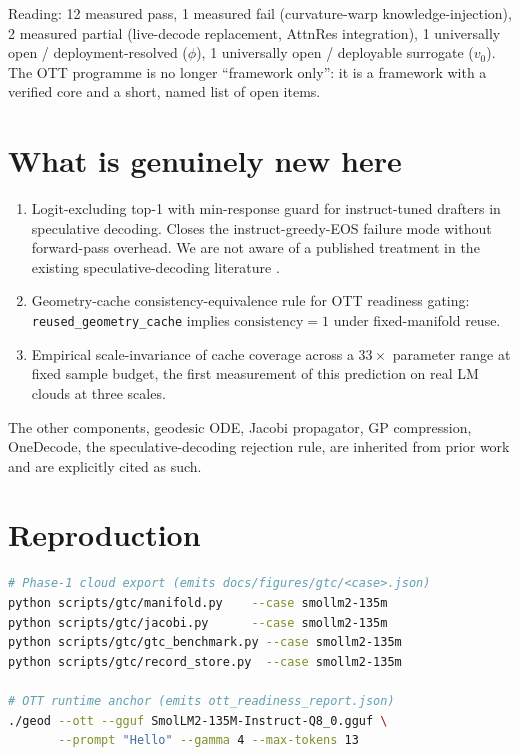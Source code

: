 \documentclass[11pt]{article}
\begin{document}
Reading: 12 measured pass, 1 measured fail (curvature-warp
knowledge-injection), 2 measured partial (live-decode replacement, AttnRes
integration), 1 universally open / deployment-resolved ($\phi$), 1
universally open / deployable surrogate ($v_0$). The OTT programme is no
longer ``framework only'': it is a framework with a verified core and a
short, named list of open items.

\section{What is genuinely new here}

\begin{enumerate}
  \item Logit-excluding top-1 with min-response guard for
        instruct-tuned drafters in speculative decoding. Closes the
        instruct-greedy-EOS failure mode without forward-pass overhead. We are
        not aware of a published treatment in the existing speculative-decoding
        literature \cite{leviathan2023fast,chen2023accelerating,cai2024medusa,li2024eagle}.
  \item Geometry-cache consistency-equivalence rule for OTT readiness
        gating: \texttt{reused\_geometry\_cache} implies $\text{consistency}=1$
        under fixed-manifold reuse.
  \item Empirical scale-invariance of cache coverage across a
        $33\times$ parameter range at fixed sample budget, the first
        measurement of this prediction on real LM clouds at three scales.
\end{enumerate}

The other components, geodesic ODE, Jacobi propagator, GP compression,
OneDecode, the speculative-decoding rejection rule, are inherited from
prior work and are explicitly cited as such.

\section{Reproduction}

\begin{lstlisting}[language=bash]
# Phase-1 cloud export (emits docs/figures/gtc/<case>.json)
python scripts/gtc/manifold.py    --case smollm2-135m
python scripts/gtc/jacobi.py      --case smollm2-135m
python scripts/gtc/gtc_benchmark.py --case smollm2-135m
python scripts/gtc/record_store.py  --case smollm2-135m

# OTT runtime anchor (emits ott_readiness_report.json)
./geod --ott --gguf SmolLM2-135M-Instruct-Q8_0.gguf \
       --prompt "Hello" --gamma 4 --max-tokens 13
\end{lstlisting}
\end{document}
